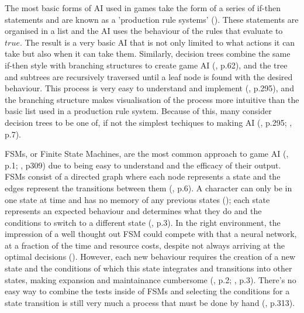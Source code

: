 \documentclass[11pt, a4paper]{article}
\begin{document}
The most basic forms of AI used in games take the form of a series of if-then statements and are known as a 'production rule systems' (\cite{tozour2002evolution}). These statements are organised in a list and the AI uses the behaviour of the rules that evaluate to $true$. The result is a very basic AI that is not only limited to what actions it can take but also when it can take them. Similarly, decision trees combine the same if-then style with branching structures to create game AI (\cite{nareyek2004ai}, p.62), and the tree and subtrees are recursively traversed until a leaf node is found with the desired behaviour. This process is very easy to understand and implement (\cite{millington2019ai}, p.295), and the branching structure makes visualisation of the process more intuitive than the basic list used in a production rule system. Because of this, many consider decision trees to be one of, if not the simplest techiques to making AI (\cite{millington2019ai}, p.295; \cite{tozour2002evolution}, p.7).

FSMs, or Finite State Machines, are the most common approach to game AI (\cite{orkin2006three}, p.1; \cite{millington2019ai}, p309) due to being easy to understand and the efficacy of their output. FSMs consist of a directed graph where each node represents a state and the edges represent the transitions between them (\cite{tozour2002evolution}, p.6). A character can only be in one state at time and has no memory of any previous states (\cite{colledanchise2014performance}); each state represents an expected behaviour and determines what they do and the conditions to switch to a different state (\cite{diller2004behavior}, p.3). In the right environment, the impression of a well thought out FSM could compete with that a neural network, at a fraction of the time and resource costs, despite not always arriving at the optimal decisions (\cite{sweetser2002current}). However, each new behaviour requires the creation of a new state and the conditions of which this state integrates and transitions into other states, making expansion and maintainance cumbersome (\cite{sweetser2002current}, p.2; \cite{lim2010evolving}, p.3). There's no easy way to combine the tests inside of FSMs and selecting the conditions for a state transition is still very much a process that must be done by hand (\cite{millington2019ai}, p.313). 
\end{document}
